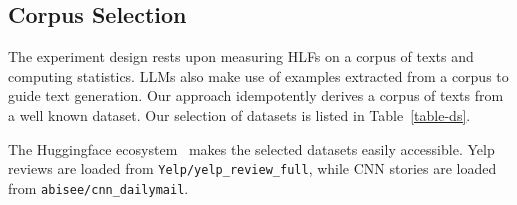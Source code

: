 \documentclass[11pt]{article}
\begin{document}
\subsection{Corpus Selection}\label{ds-selection}

The experiment design rests upon measuring HLFs on a corpus of texts and
computing statistics.
LLMs also make use of examples extracted from a corpus to guide text generation.
Our approach idempotently derives a corpus of texts from a well known dataset.
Our selection of datasets is listed in Table~\ref{table-ds}.

\begin{table}[ht!]
    \setlength\tabcolsep{6pt}
    \centering
    \caption{Source Datasets}\label{table-ds}
\end{table}

The Huggingface ecosystem~\cite{lhoest-etal-2021-datasets} makes the selected
datasets easily accessible.
Yelp reviews are loaded from \texttt{Yelp/yelp\_review\_full}, while CNN stories
are loaded from \texttt{abisee/cnn\_dailymail}.
\end{document}
